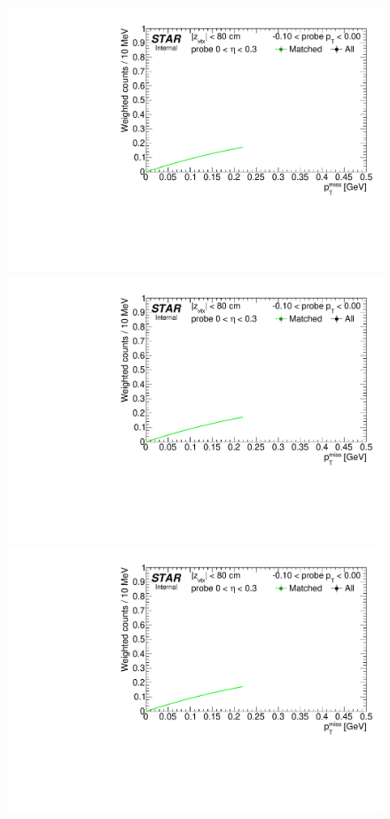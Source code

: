 \begin{figure}[h!]
{}~~~~
\parbox{0.24\textwidth}{ 
  \centering
  \includegraphics[width=\linewidth,page=6]{graphics/correctionsToEff/TOF_tagAndProbe/Fitting_effVsPt_data_ETABINS_B.CPT2.pdf}\\
  \includegraphics[width=\linewidth,page=8]{graphics/correctionsToEff/TOF_tagAndProbe/Fitting_effVsPt_data_ETABINS_B.CPT2.pdf}\\
  \includegraphics[width=\linewidth,page=10]{graphics/correctionsToEff/TOF_tagAndProbe/Fitting_effVsPt_data_ETABINS_B.CPT2.pdf}\\[84pt]

}
\end{figure}
